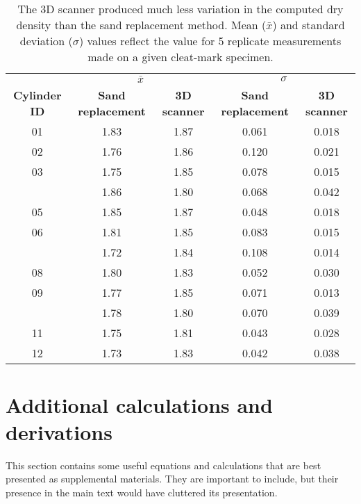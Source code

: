\documentclass[
  letterpaper,
  openany]{book}
\begin{document}
\begin{table}

\caption[Dry density for plugs using sand replacement vs. 3D scanner]{\label{tab:sand-backfill-vs-3D-scanner-for-volumetric-w-determination-table}The 3D scanner produced much less variation in the computed dry density than the sand replacement method. Mean ($\bar{x}$) and standard deviation ($\sigma$) values reflect the value for 5 replicate measurements made on a given cleat-mark specimen.}
\centering
\begin{tabular}[t]{ccccc}
\toprule
\multicolumn{1}{c}{\textbf{ }} & \multicolumn{2}{c}{\textbf{$\bar{x}$}} & \multicolumn{2}{c}{\textbf{$\sigma$}} \\
\cmidrule(l{3pt}r{3pt}){2-3} \cmidrule(l{3pt}r{3pt}){4-5}
\textbf{Cylinder ID} & \textbf{Sand replacement} & \textbf{3D scanner} & \textbf{Sand replacement} & \textbf{3D scanner}\\
\midrule
01 & 1.83 & 1.87 & 0.061 & 0.018\\
02 & 1.76 & 1.86 & 0.120 & 0.021\\
03 & 1.75 & 1.85 & 0.078 & 0.015\\
\addlinespace
04 & 1.86 & 1.80 & 0.068 & 0.042\\
05 & 1.85 & 1.87 & 0.048 & 0.018\\
06 & 1.81 & 1.85 & 0.083 & 0.015\\
\addlinespace
07 & 1.72 & 1.84 & 0.108 & 0.014\\
08 & 1.80 & 1.83 & 0.052 & 0.030\\
09 & 1.77 & 1.85 & 0.071 & 0.013\\
\addlinespace
10 & 1.78 & 1.80 & 0.070 & 0.039\\
11 & 1.75 & 1.81 & 0.043 & 0.028\\
12 & 1.73 & 1.83 & 0.042 & 0.038\\
\bottomrule
\end{tabular}
\end{table}

\newpage

\hypertarget{additional-calculations-and-derivations}{%
\section{Additional calculations and derivations}\label{additional-calculations-and-derivations}}

This section contains some useful equations and calculations that are best presented as supplemental materials.
They are important to include, but their presence in the main text would have cluttered its presentation.
\end{document}
